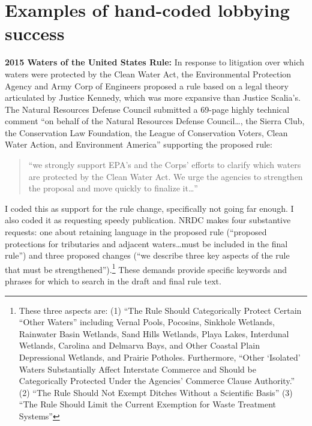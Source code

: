 \documentclass[
      12pt,
        ]{article}
\author{}
\date{\today}
\begin{document}
 














\noindent 
      \doublespacing 
    \hypertarget{examples-of-hand-coded-lobbying-success}{%
\section{Examples of hand-coded lobbying success}\label{examples-of-hand-coded-lobbying-success}}

\textbf{2015 Waters of the United States Rule:}
In response to litigation over which waters were protected by the Clean Water Act, the Environmental Protection Agency and Army Corp of Engineers proposed a rule based on a legal theory articulated by Justice Kennedy, which was more expansive than Justice Scalia's.
The Natural Resources Defense Council submitted a 69-page highly technical comment ``on behalf of the Natural Resources Defense Council\ldots, the Sierra Club, the Conservation Law Foundation, the League of Conservation Voters, Clean Water Action, and Environment America'' supporting the proposed rule:

\begin{quote}
``we strongly support EPA's and the Corps' efforts to clarify which waters are protected by the Clean Water Act. We urge the agencies to strengthen the proposal and move quickly to finalize it\ldots{}''
\end{quote}

I coded this as support for the rule change, specifically not going far enough. I also coded it as requesting speedy publication. NRDC makes four substantive requests: one about retaining language in the proposed rule (``proposed protections for tributaries and adjacent waters\ldots must be included in the final rule'') and three proposed changes (``we describe three key aspects of the rule that must be strengthened'').\footnote{These three aspects are: (1) ``The Rule Should Categorically Protect Certain ``Other Waters'' including Vernal Pools, Pocosins, Sinkhole Wetlands, Rainwater Basin Wetlands, Sand Hills Wetlands, Playa Lakes, Interdunal Wetlands, Carolina and Delmarva Bays, and Other Coastal Plain Depressional Wetlands, and Prairie Potholes. Furthermore, ``Other `Isolated' Waters Substantially Affect Interstate Commerce and Should be Categorically Protected Under the Agencies' Commerce Clause Authority.'' (2) ``The Rule Should Not Exempt Ditches Without a Scientific Basis'' (3) ``The Rule Should Limit the Current Exemption for Waste Treatment Systems''} These demands provide specific keywords and phrases for which to search in the draft and final rule text.
\end{document}
